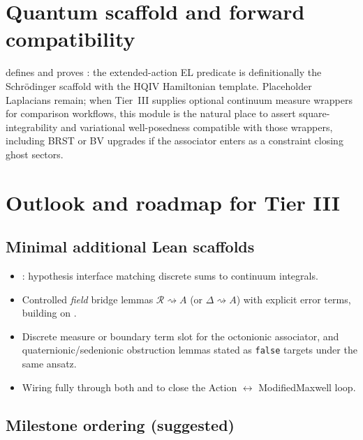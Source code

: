\documentclass[11pt]{amsart}
\begin{document}
\section{Quantum scaffold and forward compatibility}
\label{sec:quantum}

 defines  and proves : the extended-action EL predicate is definitionally the Schr\"odinger scaffold with the HQIV Hamiltonian template. Placeholder Laplacians remain; when Tier~III supplies optional continuum measure wrappers for comparison workflows, this module is the natural place to assert square-integrability and variational well-posedness compatible with those wrappers, including BRST or BV upgrades if the associator enters as a constraint closing ghost sectors.

\section{Outlook and roadmap for Tier III}
\label{sec:outlook}

\subsection{Minimal additional Lean scaffolds}

\begin{itemize}
\item {}: hypothesis interface matching discrete sums to continuum integrals.
\item Controlled \emph{field} bridge lemmas \(\mathcal{R}\rightsquigarrow A\) (or \(\Delta\rightsquigarrow A\)) with explicit error terms, building on .
\item Discrete measure or boundary term slot for the octonionic associator, and quaternionic/sedenionic obstruction lemmas stated as \texttt{false} targets under the same ansatz.
\item Wiring  fully through both  and  to close the Action \(\leftrightarrow\) ModifiedMaxwell loop.
\end{itemize}

\subsection{Milestone ordering (suggested)}
\end{document}
